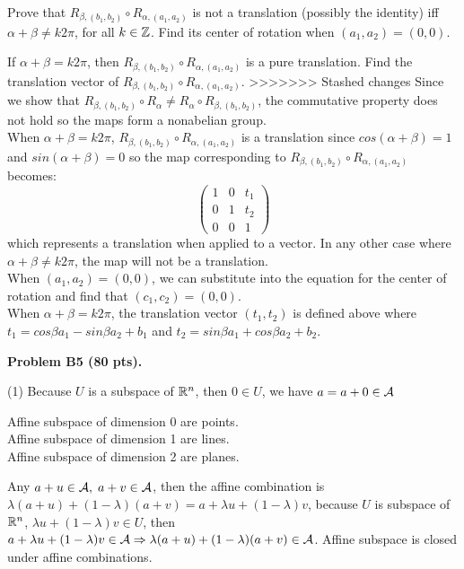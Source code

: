 \documentclass[12pt]{article}
\begin{document}
\medskip
Prove that  $R_{\beta, (b_1,b_2)} \circ R_{\alpha, (a_1,a_2)}$ is
not a translation (possibly the identity)  iff
$\alpha + \beta \not= k 2\pi$, for all  $k\in \mathbb{Z}$.
Find its center of rotation when $(a_1, a_2) = (0, 0)$.  

\medskip
If $\alpha + \beta = k 2\pi$, then  $R_{\beta, (b_1,b_2)} \circ
R_{\alpha, (a_1,a_2)}$
is a pure translation. 
Find the translation vector 
of $R_{\beta, (b_1,b_2)} \circ R_{\alpha, (a_1,a_2)}$.
>>>>>>> Stashed changes
Since we show that $R_{\beta,(b_1,b_2)} \circ R_{\alpha} \ne R_{\alpha} \circ R_{\beta,(b_1,b_2)}$, the commutative property does not hold so the maps form a nonabelian group.\\

When $\alpha + \beta = k2\pi$, $R_{\beta,(b_1,b_2)} \circ R_{\alpha,(a_1,a_2)}$ is a translation since $cos(\alpha + \beta)= 1$ and $sin(\alpha + \beta)=0$ so the map corresponding to $R_{\beta,(b_1,b_2)} \circ R_{\alpha,(a_1,a_2)}$ becomes:
$$\begin{pmatrix} 1 & 0 & t_1\\0&1& t_2\\0&0&1\end{pmatrix}$$ which represents a translation when applied to a vector. In any other case where $\alpha + \beta \ne k2\pi$, the map will not be a translation.\\

When $(a_1,a_2)=(0,0)$, we can substitute into the equation for the center of rotation and find that $(c_1,c_2)= (0,0)$.\\

When $\alpha + \beta = k2\pi$, the translation vector $(t_1,t_2)$ is defined above where $t_1= cos\beta a_1 - sin\beta a_2 + b_1$ and $t_2 = sin\beta a_1 + cos\beta a_2 + b_2$.

\vspace {0.5cm}\noindent
{\bf Problem B5 (80 pts).}

\medskip
(1)
Because $U$ is a subspace of $\mathbb{R}^n$, then $0 \in U$, we have $a = 
a + 0 \in {\cal A}$
\begin{center}
Affine subspace of dimension 0 are points. \\
Affine subspace of dimension 1 are lines. \\
Affine subspace of dimension 2 are planes. \\
\end{center}
Any $a + u \in {\cal A}, \; a + v \in {\cal A}$, then the affine combination is $\lambda (a + u) + (1 - \lambda) (a + v) = a + \lambda u + (1 - \lambda) v$, because $U$ is subspace of $\mathbb{R}^n$, $\lambda u + (1 - \lambda) v \in U$, then $a + \lambda u + (1 - \lambda) v \in {\cal A} \Rightarrow \lambda (a + u) + (1 - \lambda) (a + v) \in {\cal A}$. Affine subspace is closed under affine combinations.
\end{document}
